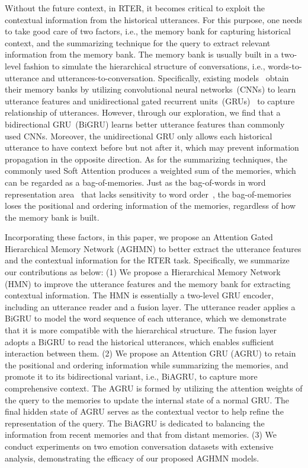\documentclass[letterpaper]{article} %
\begin{document}
Without the future context, in RTER, it becomes critical to exploit the contextual information from the historical utterances. For this purpose, one needs to take good care of two factors, i.e., the memory bank for capturing historical context, and the summarizing technique for the query to extract relevant information from the memory bank.
The memory bank is usually built in a two-level fashion to simulate the hierarchical structure of conversations, i.e., words-to-utterance and utterances-to-conversation. Specifically, existing models~\cite{DBLP:conf/emnlp/HazarikaPMCZ18,DBLP:conf/naacl/HazarikaPZCMZ18,DBLP:conf/aaai/MajumderPHMGC19} obtain their memory banks by utilizing convolutional neural networks~(CNNs) to learn utterance features and unidirectional gated recurrent units~(GRUs)~\cite{DBLP:conf/emnlp/ChoMGBBSB14} to capture relationship of utterances. However, through our exploration, we find that a bidirectional GRU~(BiGRU) learns better utterance features than commonly used CNNs. Moreover, the unidirectional GRU only allows each historical utterance to have context before but not after it, which may prevent information propagation in the opposite direction. As for the summarizing techniques, the commonly used Soft Attention produces a weighted sum of the memories, which can be regarded as a bag-of-memories. Just as the bag-of-words in word representation area~\cite{DBLP:conf/nips/MikolovSCCD13} that lacks sensitivity to word order~\cite{DBLP:conf/emnlp/LingTAFDBTL15}, the bag-of-memories loses the positional and ordering information of the memories, regardless of how the memory bank is built.

Incorporating these factors, in this paper, we propose an Attention Gated Hierarchical Memory Network (AGHMN) to better extract the utterance features and the contextual information for the RTER task. Specifically, we summarize our contributions as below: (1) We propose a Hierarchical Memory Network (HMN) to improve the utterance features and the memory bank for extracting contextual information. The HMN is essentially a two-level GRU encoder, including an utterance reader and a fusion layer.
The utterance reader applies a BiGRU to model the word sequence of each utterance, which we demonstrate that it is more compatible with the hierarchical structure. The fusion layer adopts a BiGRU to read the historical utterances, which enables sufficient interaction between them.
(2) We propose an Attention GRU (AGRU) to retain the positional and ordering information while summarizing the memories, and promote it to its bidirectional variant, i.e., BiAGRU, to capture more comprehensive context. The AGRU is formed by utilizing the attention weights of the query to the memories to update the internal state of a normal GRU. The final hidden state of AGRU serves as the contextual vector to help refine the representation of the query. The BiAGRU is dedicated to balancing the information from recent memories and that from distant memories.
(3) We conduct experiments on two emotion conversation datasets with extensive analysis, demonstrating the efficacy of our proposed AGHMN models.
\end{document}
